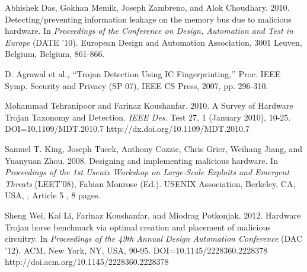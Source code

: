 \documentclass[letterpaper,twocolumn,11pt]{article}
\begin{document}
\begin{thebibliography}{1}

   Abhishek Das, Gokhan Memik, Joseph Zambreno, and Alok Choudhary. 2010. Detecting/preventing information leakage on the memory bus due to malicious hardware. In {\em Proceedings of the Conference on Design, Automation and Test in Europe} (DATE '10). European Design and Automation Association, 3001 Leuven, Belgium, Belgium, 861-866.

   D. Agrawal et al., ‘‘Trojan Detection Using IC Fingerprinting,’’ Proc. IEEE Symp. Security and Privacy (SP 07), IEEE CS Press, 2007, pp. 296-310.

   Mohammad Tehranipoor and Farinaz Koushanfar. 2010. A Survey of Hardware Trojan Taxonomy and Detection. {\em IEEE Des.} Test 27, 1 (January 2010), 10-25. DOI=10.1109/MDT.2010.7 http://dx.doi.org/10.1109/MDT.2010.7

   Samuel T. King, Joseph Tucek, Anthony Cozzie, Chris Grier, Weihang Jiang, and Yuanyuan Zhou. 2008. Designing and implementing malicious hardware. In {\em Proceedings of the 1st Usenix Workshop on Large-Scale Exploits and Emergent Threats} (LEET'08), Fabian Monrose (Ed.). USENIX Association, Berkeley, CA, USA, , Article 5 , 8 pages.

   Sheng Wei, Kai Li, Farinaz Koushanfar, and Miodrag Potkonjak. 2012. Hardware Trojan horse benchmark via optimal creation and placement of malicious circuitry. In {\em Proceedings of the 49th Annual Design Automation Conference} (DAC '12). ACM, New York, NY, USA, 90-95. DOI=10.1145/2228360.2228378 http://doi.acm.org/10.1145/2228360.2228378

\end{thebibliography}
\end{document}
